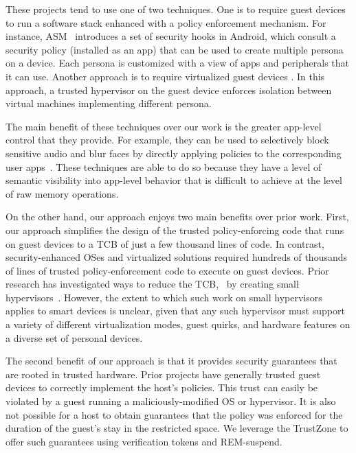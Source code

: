 These projects tend to use one of two techniques. One is to require guest
devices to run a software stack enhanced with a policy enforcement mechanism.
For instance, ASM~\cite{asm:sec14} introduces a set of security hooks in
Android, which consult a security policy (installed as an app) that can be used
to create multiple persona on a device. Each persona is customized with a view
of apps and peripherals that it can use. Another approach is to require
virtualized guest devices
\cite{cells:sosp11,cox:hotmobile07,vmwareverizon,kvmarm:asplos14}. In this
approach, a trusted hypervisor on the guest device enforces isolation between
virtual machines implementing different persona.

The main benefit of these techniques over our work is the greater app-level
control that they provide. For example, they can be used to selectively block
sensitive audio and blur faces by directly applying policies to the
corresponding user apps~\cite{worlddriven:ccs14,ar:sec13}. These techniques
are able to do so because they have a level of semantic visibility into
app-level behavior that is difficult to achieve at the level of raw memory
operations.

On the other hand, our approach enjoys two main benefits over prior work.
First, our approach simplifies the design of the trusted policy-enforcing code
that runs on guest devices to a TCB of just a few thousand lines of code. In
contrast, security-enhanced OSes and virtualized solutions required hundreds of
thousands of lines of trusted policy-enforcement code to execute on guest
devices.  Prior research has investigated ways to reduce the TCB, \eg~by
creating small hypervisors~\cite{nova:eurosys09}. However, the extent to which
such work on small hypervisors applies to smart devices is unclear, given that
any such hypervisor must support a variety of different virtualization modes,
guest quirks, and hardware features on a diverse set of personal devices.

The second benefit of our approach is that it provides security guarantees that
are rooted in trusted hardware. Prior projects have generally trusted guest
devices to correctly implement the host's policies. This trust can easily be
violated by a guest running a maliciously-modified OS or hypervisor.  It is
also not possible for a host to obtain guarantees that the policy was enforced
for the duration of the guest's stay in the restricted space. We leverage the
TrustZone to offer such guarantees using verification tokens and REM-suspend.

